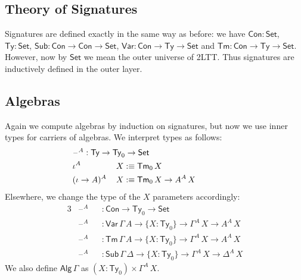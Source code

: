 \documentclass[12pt,a4paper,twoside,openany]{book}
\theoremstyle{remark}
\theoremstyle{definition}
\theoremstyle{theorem}
\newcommand{\ms}[1]{\mathsf{#1}}
\newcommand{\Con}{\mathsf{Con}}
\newcommand{\Sub}{\mathsf{Sub}}
\newcommand{\Tm}{\mathsf{Tm}}
\newcommand{\Ty}{\mathsf{Ty}}
\newcommand{\blank}{\mathord{\hspace{1pt}\text{--}\hspace{1pt}}}
\newcommand{\Set}{\mathsf{Set}}
\newcommand{\Var}{\ms{Var}}
\newcommand{\defn}{:\equiv}
\begin{document}
\subsection{Theory of Signatures}
Signatures are defined exactly in the same way as before: we have $\Con : \Set$,
$\Ty : \Set$, $\Sub : \Con \to \Con \to \Set$, $\Var : \Con \to \Ty \to \Set$ and
$\Tm : \Con \to \Ty \to \Set$. However, now by $\Set$ we mean the outer universe
of 2LTT. Thus signatures are inductively defined in the outer layer.

\subsection{Algebras}
\label{sec:2ltt-simple-algebras}

Again we compute algebras by induction on signatures, but now we use inner
types for carriers of algebras. We interpret types as follows:
\begin{alignat*}{3}
& \hspace{-4em} \rlap{$\blank^A : \Ty \to \Ty_0 \to \Set$} \\
& \hspace{-4em} \iota^A\,&&X \defn \Tm_0\,X \\
& \hspace{-4em} (\iota\to A)^A\,&&X \defn \Tm_0\,X \to A^A\,X
\end{alignat*}
Elsewhere, we change the type of the $X$ parameters accordingly:
\begin{alignat*}{3}
& \blank^A &&: \Con \to \Ty_0 \to \Set\\
& \blank^A &&: \Var\,\Gamma\,A \to \{X : \Ty_0\} \to \Gamma^A\,X \to A^A\,X\\
& \blank^A &&: \Tm\,\Gamma\,A \to \{X : \Ty_0\} \to \Gamma^A\,X \to A^A\,X\\
& \blank^A &&: \Sub\,\Gamma\,\Delta \to \{X : \Ty_0\} \to \Gamma^A\,X \to \Delta^A\,X
\end{alignat*}
We also define $\ms{Alg}\,\Gamma$ as $(X : \Ty_0) \times \Gamma^A\,X$.
\end{document}
